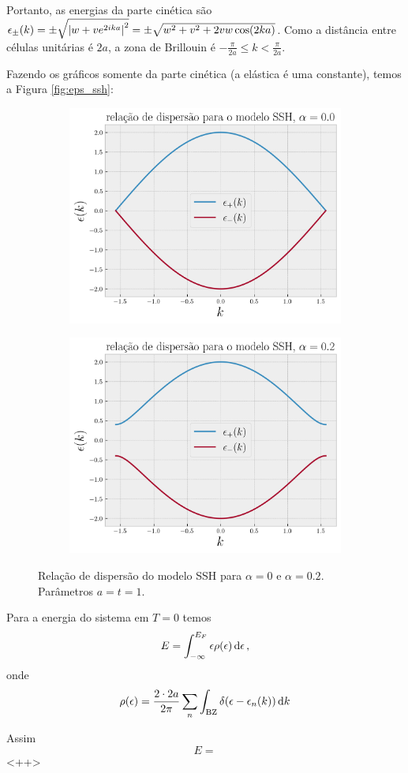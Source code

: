 \documentclass[a4paper,10pt]{article}
\begin{document}
Portanto, as energias da parte cinética são $\epsilon_\pm(k) = \pm \sqrt{\abs{w + v e^{2ika}}^2} = \pm \sqrt{w^2 + v^2 + 2 vw \cos(2ka)}$. Como a distância entre células unitárias é $2a$, a zona de Brillouin é $-\frac{\pi}{2a} \leq k < \frac{\pi}{2a}$.

Fazendo os gráficos somente da parte cinética (a elástica é uma constante), temos a Figura \ref{fig:eps_ssh}:
\begin{figure}[H]
\centering
\label{fig:eps_ssh}
\begin{subfigure}{.45\textwidth}
  \centering
  \includegraphics[width=\linewidth]{fig/eps_ssh_alpha0.png}
  \label{fig:ssh_alpha0}
\end{subfigure}
\begin{subfigure}{.45\textwidth}
  \centering
  \includegraphics[width=\linewidth]{fig/eps_ssh_alphanot0.png}
  \label{fig:ssh_alphanot0}
\end{subfigure}
\caption{Relação de dispersão do modelo SSH para $\alpha = 0$ e $\alpha = 0.2$. Parâmetros $a = t = 1$.}
\end{figure}

Para a energia do sistema em $T = 0$ temos
$$
E = \int_{-\infty}^{E_F} \epsilon \rho(\epsilon) \dd{\epsilon},
$$
onde
$$
\rho(\epsilon) = \frac{2 \cdot 2a}{2\pi} \sum_{n} \int_{\text{BZ}} \delta(\epsilon - \epsilon_n(k)) \dd{k}
$$

Assim
$$
E =
$$
<++>
\end{document}
